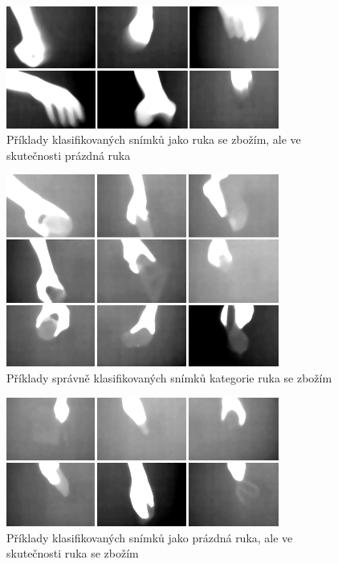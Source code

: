 \begin{figure}[h]
  \centering
  \includegraphics[width=0.8\textwidth]{images/empty_hand_wrong.png}
  \caption{Příklady klasifikovaných snímků jako ruka se zbožím, ale ve skutečnosti prázdná ruka}
  \label{fig:empty_hand_wrong}
\end{figure} 

\begin{figure}[h]
  \centering
  \includegraphics[width=0.8\textwidth]{images/hand_with_goods_correct.png}
  \caption{Příklady správně klasifikovaných snímků kategorie ruka se zbožím}
  \label{fig:hand_with_goods_correct}
\end{figure} 

\begin{figure}[h]
  \centering
  \includegraphics[width=0.8\textwidth]{images/hand_with_goods_wrong.png}
  \caption{Příklady klasifikovaných snímků jako prázdná ruka, ale ve skutečnosti ruka se zbožím}
  \label{fig:hand_with_goods_wrong}
\end{figure} 

